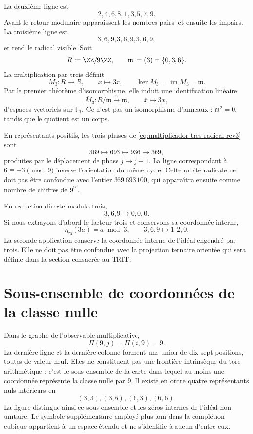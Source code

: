 La deuxième ligne est
\[
2,4,6,8,1,3,5,7,9.
\]
Avant le retour modulaire apparaissent les nombres pairs, et ensuite les impairs. La troisième
ligne est
\[
3,6,9,3,6,9,3,6,9,
\]
et rend le radical visible. Soit
\[
 R:=\ZZ/9\ZZ,
 \qquad
 \mathfrak m:=(3)=\{\overline0,\overline3,\overline6\}.
\]
La multiplication par trois définit
\[
 M_3:R\longrightarrow R,
 \qquad x\longmapsto3x,
 \qquad
 \ker M_3=\operatorname{im}M_3=\mathfrak m.
\]
Par le premier théorème d'isomorphisme, elle induit une identification linéaire
\begin{equation}
 \overline M_3:R/\mathfrak m\xrightarrow{\ \sim\ }\mathfrak m,
 \qquad \overline x\longmapsto3x,
 \label{eq:multiplicador-tres-radical-rev3}
\end{equation}
d'espaces vectoriels sur \(\mathbb F_3\). Ce n'est pas un isomorphisme
d'anneaux : \(\mathfrak m^2=0\), tandis que le quotient est un corps.

En représentants positifs, les trois phases de
\eqref{eq:multiplicador-tres-radical-rev3} sont
\begin{equation}
 369\longmapsto693\longmapsto936\longmapsto369,
 \label{eq:orbita-radical-369-rev3}
\end{equation}
produites par le déplacement de phase \(j\mapsto j+1\). La ligne
correspondant à \(6\equiv-3\pmod9\) inverse l'orientation du même
cycle. Cette orbite radicale ne doit pas être confondue avec l'entier
\(369\,693\,100\), qui apparaîtra ensuite comme nombre de chiffres de
\(9^{9^9}\).

En réduction directe modulo trois,
\[
3,6,9\longmapsto0,0,0.
\]
Si nous extrayons d'abord le facteur trois et conservons sa coordonnée interne,
\[
\eta_{\mathfrak m}(3a)=a\bmod3,
\qquad
3,6,9\longmapsto1,2,0.
\]
La seconde application conserve la coordonnée interne de l'idéal engendré par
trois. Elle ne doit pas être confondue avec la projection ternaire orientée qui sera définie
dans la section consacrée au TRIT\@.

\section{Sous-ensemble de coordonnées de la classe nulle}

Dans le graphe de l'observable multiplicative,
\[
\Pi(9,j)=\Pi(i,9)=9.
\]
La dernière ligne et la dernière colonne forment une union de dix-sept positions,
toutes de valeur neuf. Elles ne constituent pas une frontière intrinsèque du tore
arithmétique : c'est le sous-ensemble de la carte dans lequel au moins une coordonnée
représente la classe nulle par \(9\). Il existe en outre quatre représentants nuls intérieurs en
\[
(3,3),(3,6),(6,3),(6,6).
\]
La figure distingue ainsi ce sous-ensemble et les zéros internes de l'idéal
non unitaire. Le symbole supplémentaire employé plus loin dans la complétion
cubique appartient à un espace étendu et ne s'identifie à aucun
d'entre eux.

